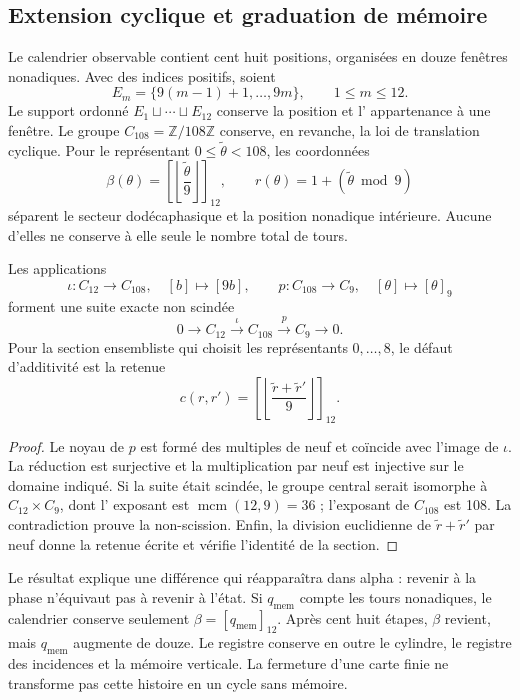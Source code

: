 

\subsection{Extension cyclique et graduation de mémoire}
\label{x_reciprocidad:subsec:k-calendario}

Le calendrier observable contient cent huit positions, organisées en douze fenêtres nonadiques. Avec des indices positifs, soient
\[
 E_m=\{9(m-1)+1,\ldots,9m\},\qquad 1\leq m\leq12.
\]
Le support ordonné \(E_1\sqcup\cdots\sqcup E_{12}\) conserve la position et l'
appartenance à une fenêtre. Le groupe \(C_{108}=\mathbb Z/108\mathbb Z\)
conserve, en revanche, la loi de translation cyclique. Pour le représentant
\(0\leq\widetilde\theta<108\), les coordonnées
\[
 \beta(\theta)=\left[\left\lfloor\frac{\widetilde\theta}{9}\right\rfloor\right]_{12},
 \qquad r(\theta)=1+(\widetilde\theta\bmod9)
\]
séparent le secteur dodécaphasique et la position nonadique intérieure. Aucune d'elles ne conserve à elle seule le nombre total de tours.

\begin{proposition}
\label{x_reciprocidad:prop:k-extension}
Les applications
\[
 \iota:C_{12}\longrightarrow C_{108},\quad[b]\longmapsto[9b],
 \qquad p:C_{108}\longrightarrow C_9,\quad[\theta]\longmapsto[\theta]_9
\]
forment une suite exacte non scindée
\[
 0\longrightarrow C_{12}\xrightarrow{\iota}C_{108}
 \xrightarrow{p}C_9\longrightarrow0.
\]
Pour la section ensembliste qui choisit les représentants \(0,\ldots,8\), le défaut d'additivité est la retenue
\[
 c(r,r')=\left[\left\lfloor\frac{\widetilde r+\widetilde r'}9\right\rfloor\right]_{12}.
\]
\end{proposition}

\begin{proof}
Le noyau de \(p\) est formé des multiples de neuf et coïncide avec
l'image de \(\iota\). La réduction est surjective et la multiplication
par neuf est injective sur le domaine indiqué. Si la suite était
scindée, le groupe central serait isomorphe à \(C_{12}\times C_9\), dont l'
exposant est \(\operatorname{mcm}(12,9)=36\) ; l'exposant de
\(C_{108}\) est 108. La contradiction prouve la non-scission. Enfin,
la division euclidienne de \(\widetilde r+\widetilde r'\) par neuf donne la
retenue écrite et vérifie l'identité de la section.
\end{proof}

Le résultat explique une différence qui réapparaîtra dans alpha : revenir à la
phase n’équivaut pas à revenir à l’état. Si \(q_{\mathrm{mem}}\) compte les
tours nonadiques, le calendrier conserve seulement
\(\beta=[q_{\mathrm{mem}}]_{12}\). Après cent huit étapes,
\(\beta\) revient, mais \(q_{\mathrm{mem}}\) augmente de douze. Le
registre conserve en outre le cylindre, le registre des incidences et la mémoire
verticale. La fermeture d’une carte finie ne transforme pas cette histoire en un
cycle sans mémoire.

